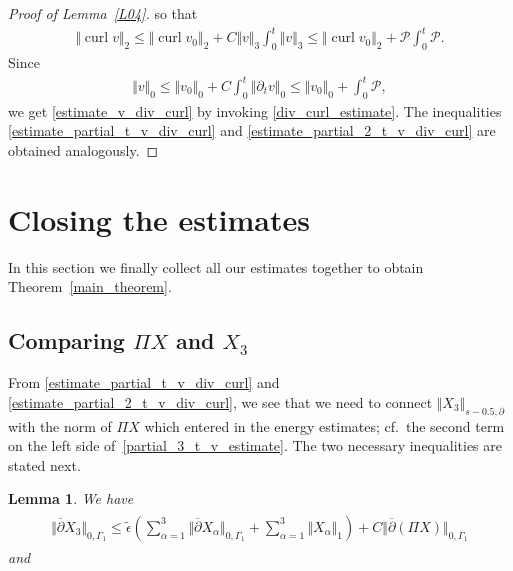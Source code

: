 \documentclass[10pt,reqno]{amsart}
\theoremstyle{plain}
\newtheorem{lemma}[theorem]{Lemma}
\theoremstyle{definition}
\numberwithin{equation}{section}
\newcommand{\ccP}{\mathscr{P}}
\newcommand{\al}{\alpha}
\newcommand{\Ga}{\Gamma}
\newcommand{\de}{\delta}
\newcommand{\curl}{\operatorname{curl}}
\newcommand{\norm}[1]{\Vert#1\Vert}
\begin{document}
{{\begin{proof}[Proof of Lemma~\ref{L04}]
so that 
\begin{gather}
\norm{\curl v}_2 
\leq 
\norm{ \curl v_0}_2
+
C \norm{v}_3 \int_0^t \norm{v}_3 
\leq 
\norm{ \curl v_0}_2
+
\ccP \int_0^t \ccP
.
\nonumber
\end{gather}
Since
\begin{gather}
\norm{ v}_0 \leq \norm{v_0}_0 + C \int_0^t \norm{ \partial_t v}_0
            \leq \norm{v_0}_0 +  \int_0^t \ccP,
\nonumber
\end{gather}
we get 
\eqref{estimate_v_div_curl} by
invoking  \eqref{div_curl_estimate}.
The inequalities 
\eqref{estimate_partial_t_v_div_curl}
and
\eqref{estimate_partial_2_t_v_div_curl}
are obtained analogously.
\end{proof}


\section{Closing the estimates\label{section_closing}}
 
In this section we finally collect all our estimates together to obtain
Theorem~\ref{main_theorem}. 


\subsection{Comparing $\Pi X$ and $X_3$}

From \eqref{estimate_partial_t_v_div_curl} and \eqref{estimate_partial_2_t_v_div_curl},
we see that we need to connect 
$\norm{ X_3 }_{s - 0.5,\partial}$ 
with the norm
of $\Pi X$ which entered in the energy estimates;
cf.~the second term on the left side of~\eqref{partial_3_t_v_estimate}.
The two necessary inequalities are stated next.

\begin{lemma}
\label{L05}
We have
\begin{align}
\begin{split}
\norm{ \overline{\partial} X_3 }_{0,\Ga_1}
\leq \widetilde{\epsilon} \left(
\sum_{\al=1}^3 \norm{ \overline{\partial} X_\al }_{0,\Ga_1}
+
\sum_{\al=1}^3 \norm{  X_\al }_{1} \right)
+
C\norm{\overline{\partial}( \Pi X) }_{0,\Ga_1}
\end{split}
\label{estimate_projection_N}
\end{align}
and


\end{lemma}}}
\end{document}
